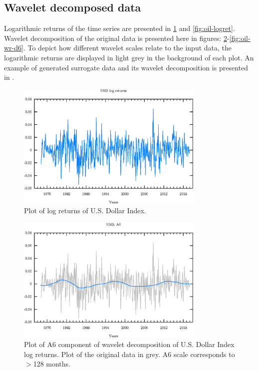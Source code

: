 \subsection{Wavelet decomposed data}
Logarithmic returns of the time series are presented in \ref{fig:usd-logret} and \ref{fig:oil-logret}.
Wavelet decomposition of the original data is presented here in figures: \ref{fig:usd-wr-a6}-\ref{fig:oil-wr-d6}.
To depict how different wavelet scales relate to the input data, the logarithmic returns are displayed in light grey in the background of each plot.
An example of generated surrogate data and its wavelet decomposition is presented in .

\begin{figure}[h]
\begin{center}
\includegraphics[width=0.8\textwidth]{./code/plot/dollar_logret.eps}
\caption{Plot of log returns of U.S. Dollar Index.}
\label{fig:usd-logret}
\end{center}
\end{figure}

\begin{figure}
\begin{center}
\includegraphics[width=0.8\textwidth]{./code/plot/usd_wr_A6.eps}
\caption{Plot of A6 component of wavelet decomposition of U.S. Dollar Index log returns. 
	Plot of the original data in grey. A6 scale corresponds to $>$128 months.}
\label{fig:usd-wr-a6}
\end{center}
\end{figure}

